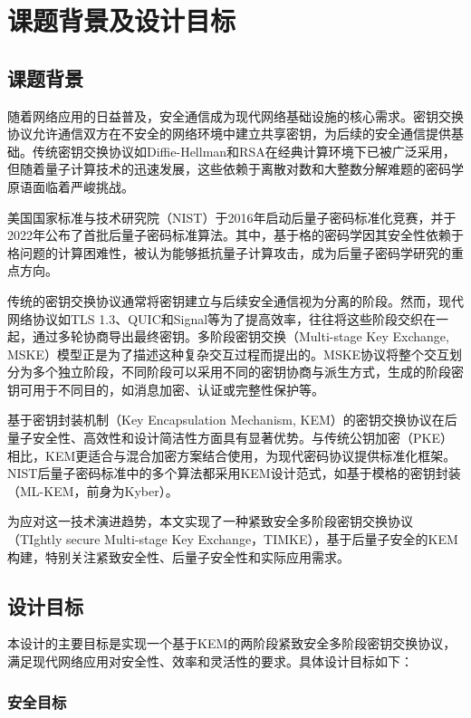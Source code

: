 \section{课题背景及设计目标}

\subsection{课题背景}

随着网络应用的日益普及，安全通信成为现代网络基础设施的核心需求。密钥交换协议允许通信双方在不安全的网络环境中建立共享密钥，为后续的安全通信提供基础。传统密钥交换协议如Diffie-Hellman和RSA在经典计算环境下已被广泛采用，但随着量子计算技术的迅速发展，这些依赖于离散对数和大整数分解难题的密码学原语面临着严峻挑战。

美国国家标准与技术研究院（NIST）于2016年启动后量子密码标准化竞赛，并于2022年公布了首批后量子密码标准算法。其中，基于格的密码学因其安全性依赖于格问题的计算困难性，被认为能够抵抗量子计算攻击，成为后量子密码学研究的重点方向。

传统的密钥交换协议通常将密钥建立与后续安全通信视为分离的阶段。然而，现代网络协议如TLS 1.3、QUIC和Signal等为了提高效率，往往将这些阶段交织在一起，通过多轮协商导出最终密钥。多阶段密钥交换（Multi-stage Key Exchange, MSKE）模型正是为了描述这种复杂交互过程而提出的。MSKE协议将整个交互划分为多个独立阶段，不同阶段可以采用不同的密钥协商与派生方式，生成的阶段密钥可用于不同目的，如消息加密、认证或完整性保护等。

基于密钥封装机制（Key Encapsulation Mechanism, KEM）的密钥交换协议在后量子安全性、高效性和设计简洁性方面具有显著优势。与传统公钥加密（PKE）相比，KEM更适合与混合加密方案结合使用，为现代密码协议提供标准化框架。NIST后量子密码标准中的多个算法都采用KEM设计范式，如基于模格的密钥封装（ML-KEM，前身为Kyber）。

为应对这一技术演进趋势，本文实现了一种紧致安全多阶段密钥交换协议（TIghtly secure Multi-stage Key Exchange，TIMKE），基于后量子安全的KEM构建，特别关注紧致安全性、后量子安全性和实际应用需求。

\subsection{设计目标}

本设计的主要目标是实现一个基于KEM的两阶段紧致安全多阶段密钥交换协议，满足现代网络应用对安全性、效率和灵活性的要求。具体设计目标如下：

\subsubsection{安全目标}

